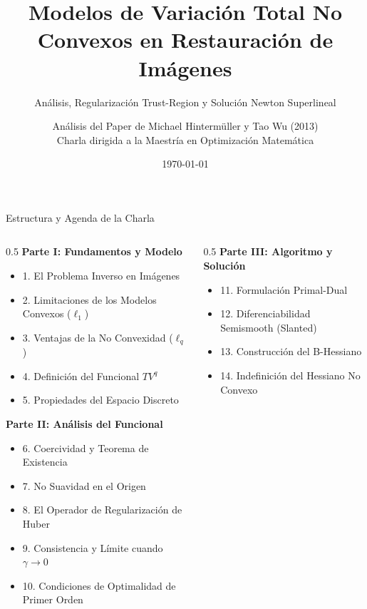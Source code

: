 \documentclass[aspectratio=169,11pt]{beamer}
\title[Modelos TV No Convexos en Optimización]{Modelos de Variación Total No Convexos en Restauración de Imágenes}
\subtitle{Análisis, Regularización Trust-Region y Solución Newton Superlineal}
\author[Hintermüller \& Wu]{Análisis del Paper de Michael Hintermüller y Tao Wu (2013) \\ \vspace{0.2cm} \small Charla dirigida a la Maestría en Optimización Matemática}
\institute[Matemática Aplicada]{Facultad de Ciencias - Ingeniería Matemática}
\date{\today}
\begin{document}
\begin{frame}[plain]
    \titlepage
\end{frame}

\begin{frame}{Estructura y Agenda de la Charla}
    \begin{columns}[t]
        \begin{column}{0.5\textwidth}
            \small
            \textbf{Parte I: Fundamentos y Modelo}
            \begin{itemize}
                \item 1. El Problema Inverso en Imágenes
                \item 2. Limitaciones de los Modelos Convexos ($\ell_1$)
                \item 3. Ventajas de la No Convexidad ($\ell_q$)
                \item 4. Definición del Funcional $TV^q$
                \item 5. Propiedades del Espacio Discreto
            \end{itemize}
            \vspace{0.2cm}
            \textbf{Parte II: Análisis del Funcional}
            \begin{itemize}
                \item 6. Coercividad y Teorema de Existencia
                \item 7. No Suavidad en el Origen
                \item 8. El Operador de Regularización de Huber
                \item 9. Consistencia y Límite cuando $\gamma \to 0$
                \item 10. Condiciones de Optimalidad de Primer Orden
            \end{itemize}
        \end{column}
        \begin{column}{0.5\textwidth}
            \small
            \textbf{Parte III: Algoritmo y Solución}
            \begin{itemize}
                \item 11. Formulación Primal-Dual
                \item 12. Diferenciabilidad Semismooth (Slanted)
                \item 13. Construcción del B-Hessiano
                \item 14. Indefinición del Hessiano No Convexo

\end{itemize}
\end{column}
\end{columns}
\end{frame}
\end{document}
